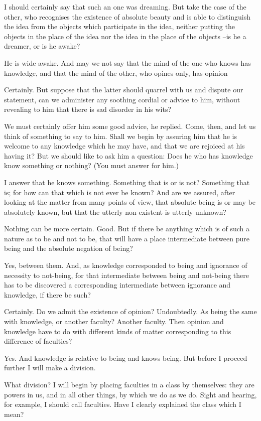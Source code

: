 I should certainly say that such an one was dreaming.
But take the case of the other, who recognises the existence of absolute beauty and is able to distinguish the idea from the objects which participate in the idea, neither putting the objects in the place of the idea nor the idea in the place of the objects --is he a dreamer, or is he awake?

He is wide awake.
And may we not say that the mind of the one who knows has knowledge, and that the mind of the other, who opines only, has opinion

Certainly.
But suppose that the latter should quarrel with us and dispute our statement, can we administer any soothing cordial or advice to him, without revealing to him that there is sad disorder in his wits?

We must certainly offer him some good advice, he replied.
Come, then, and let us think of something to say to him. Shall we begin by assuring him that he is welcome to any knowledge which he may have, and that we are rejoiced at his having it? But we should like to ask him a question: Does he who has knowledge know something or nothing? (You must answer for him.)

I answer that he knows something.
Something that is or is not?
Something that is; for how can that which is not ever be known?
And are we assured, after looking at the matter from many points of view, that absolute being is or may be absolutely known, but that the utterly non-existent is utterly unknown?

Nothing can be more certain.
Good. But if there be anything which is of such a nature as to be and not to be, that will have a place intermediate between pure being and the absolute negation of being?

Yes, between them.
And, as knowledge corresponded to being and ignorance of necessity to not-being, for that intermediate between being and not-being there has to be discovered a corresponding intermediate between ignorance and knowledge, if there be such?

Certainly.
Do we admit the existence of opinion?
Undoubtedly.
As being the same with knowledge, or another faculty?
Another faculty.
Then opinion and knowledge have to do with different kinds of matter corresponding to this difference of faculties?

Yes.
And knowledge is relative to being and knows being. But before I proceed further I will make a division.

What division?
I will begin by placing faculties in a class by themselves: they are powers in us, and in all other things, by which we do as we do. Sight and hearing, for example, I should call faculties. Have I clearly explained the class which I mean?

